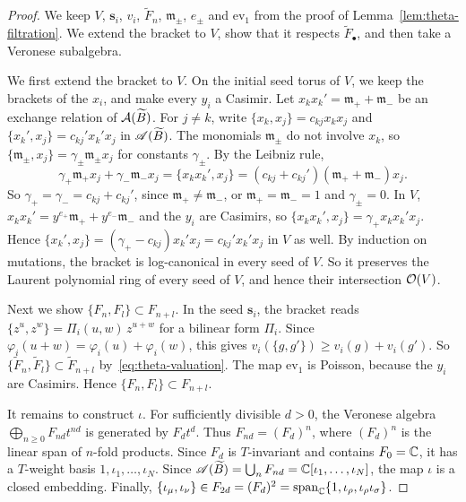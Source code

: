 \documentclass[12pt, letter]{amsart}
\theoremstyle{definition}
\begin{document}
\begin{proof}
We keep $V$, $\mathbf s_i$, $v_i$, $\widetilde F_n$, $\mathfrak m_\pm$, $e_\pm$ and $\mathrm{ev}_1$ from the proof of Lemma~\ref{lem:theta-filtration}.
We extend the bracket to $V$, show that it respects $\widetilde F_\bullet$, and then take a Veronese subalgebra.

We first extend the bracket to $V$.
On the initial seed torus of $V$, we keep the brackets of the $x_i$, and make every $y_i$ a Casimir.
Let $x_kx_k'=\mathfrak m_++\mathfrak m_-$ be an exchange relation of $\mathcal{A}(\widetilde B)$.
For $j\ne k$, write $\{x_k,x_j\}=c_{kj}x_kx_j$ and $\{x_k',x_j\}=c_{kj}'x_k'x_j$ in $\mathscr{A}(\widetilde B)$.
The monomials $\mathfrak m_\pm$ do not involve $x_k$, so $\{\mathfrak m_\pm,x_j\}=\gamma_\pm\mathfrak m_\pm x_j$ for constants $\gamma_\pm$.
By the Leibniz rule,
\[
 \gamma_+\mathfrak m_+x_j+\gamma_-\mathfrak m_-x_j=\{x_kx_k',x_j\}=(c_{kj}+c_{kj}')(\mathfrak m_++\mathfrak m_-)x_j .
\]
So $\gamma_+=\gamma_-=c_{kj}+c_{kj}'$, since $\mathfrak m_+\ne\mathfrak m_-$, or $\mathfrak m_+=\mathfrak m_-=1$ and $\gamma_\pm=0$.
In $V$, $x_kx_k'=y^{e_+}\mathfrak m_++y^{e_-}\mathfrak m_-$ and the $y_i$ are Casimirs, so $\{x_kx_k',x_j\}=\gamma_+x_kx_k'x_j$.
Hence $\{x_k',x_j\}=(\gamma_+-c_{kj})x_k'x_j=c_{kj}'x_k'x_j$ in $V$ as well.
By induction on mutations, the bracket is log-canonical in every seed of $V$.
So it preserves the Laurent polynomial ring of every seed of $V$, and hence their intersection $\mathcal{O}(V)$.

Next we show $\{F_n,F_l\}\subset F_{n+l}$.
In the seed $\mathbf s_i$, the bracket reads $\{z^u,z^w\}=\Pi_i(u,w)\,z^{u+w}$ for a bilinear form $\Pi_i$.
Since $\varphi_i(u+w)=\varphi_i(u)+\varphi_i(w)$, this gives $v_i(\{g,g'\})\ge v_i(g)+v_i(g')$.
So $\{\widetilde F_n,\widetilde F_l\}\subset\widetilde F_{n+l}$ by~\eqref{eq:theta-valuation}.
The map $\mathrm{ev}_1$ is Poisson, because the $y_i$ are Casimirs.
Hence $\{F_n,F_l\}\subset F_{n+l}$.

It remains to construct $\iota$.
For sufficiently divisible $d>0$, the Veronese algebra $\bigoplus_{n\ge0}F_{nd}t^{nd}$ is generated by $F_dt^d$.
Thus $F_{nd}=(F_d)^n$, where $(F_d)^n$ is the linear span of $n$-fold products.
Since $F_d$ is $T$-invariant and contains $F_0=\mathbb{C}$, it has a $T$-weight basis $1,\iota_1,\dots,\iota_N$.
Since $\mathscr{A}(\widetilde B)=\bigcup_nF_{nd}=\mathbb{C}[\iota_1,\dots,\iota_N]$, the map $\iota$ is a closed embedding.
Finally, $\{\iota_\mu,\iota_\nu\}\in F_{2d}=(F_d)^2=\operatorname{span}_{\mathbb{C}}\{1,\iota_\rho,\iota_\rho\iota_\sigma\}$.
\end{proof}
\end{document}
